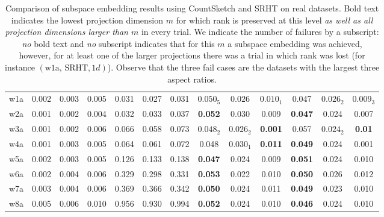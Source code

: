 \begin{table}[ht]
\begin{adjustbox}{width=1\textwidth}
\begin{tabular}{|c|c|c|c|c|c|c|c|c|c|c|c|c|}
\hline

w1a & 0.002 & 0.003 & 0.005 & 0.031 & 0.027 & 0.031 & $0.050_5$ & $0.026$ & $0.010_1$ & 0.047 & $0.026_2$ & $0.009_3$ \\

w2a & 0.001 & 0.002 & 0.004 & 0.032 & 0.033 & 0.037 & \textbf{0.052} & 0.030 & 0.009 & \textbf{0.047} & 0.024 & 0.007 \\

w3a & 0.001 & 0.002 & 0.006 & 0.066 & 0.058 & 0.073 & $0.048_2$ & $0.026_2$ & \textbf{0.001} & 0.057 & $0.024_2$ & \textbf{0.01} \\

w4a & 0.001 & 0.003 & 0.005 & 0.064 & 0.061 & 0.072 & 0.048 & $0.030_1$ & \textbf{0.011} & \textbf{0.049} & 0.024 & 0.001 \\

w5a & 0.002 & 0.003 & 0.005 & 0.126 & 0.133 & 0.138 & \textbf{0.047} & 0.024 & 0.009 & \textbf{0.051} & 0.024 & 0.010 \\

w6a & 0.002 & 0.004 & 0.006 & 0.329 & 0.298 & 0.331 & \textbf{0.053} & 0.022 & 0.010 & \textbf{0.050} &  0.026 & 0.012 \\

w7a & 0.003 & 0.004 & 0.006 & 0.369 & 0.366 & 0.342 & \textbf{0.050} & 0.024 & 0.011 & \textbf{0.049} & 0.023 & 0.010 \\

w8a & 0.005 & 0.006 & 0.010 & 0.956 & 0.930 & 0.994 & \textbf{0.052} & 0.024 & 0.010 & \textbf{0.046} & 0.024 & 0.010 \\
\hline
\end{tabular}
\end{adjustbox}
\caption{Comparison of subspace embedding results using CountSketch and SRHT
on real datasets.
Bold text indicates
the lowest projection dimension $m$ for which rank is preserved at this level
\textit{as well as all projection dimensions larger than $m$} in every trial.
We indicate the number of failures by a subscript: \textit{no} bold text and
\textit{no} subscript indicates that for this $m$ a subspace embedding was
achieved, however, for at least one of the larger projections there was a trial
in which rank was lost (for instance $(\text{w1a, SRHT}, 1d)$).
Observe that the three fail cases are the datasets  with the largest three
aspect ratios.}
\label{table: real-data-subspace-embedding}
\end{table}



